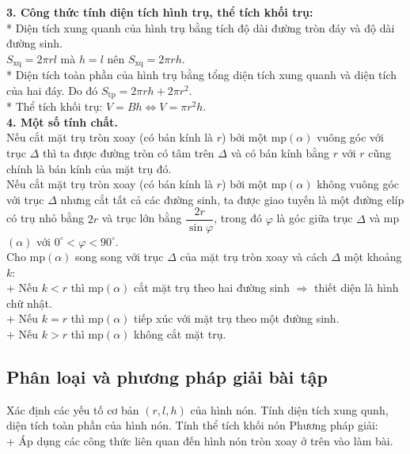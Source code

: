 \textbf{3. Công thức tính diện tích hình trụ, thể tích khối trụ:}\\
* Diện tích xung quanh của hình trụ bằng tích độ dài đường tròn đáy và độ dài đường sinh.\\
 $S_{\text{xq}}=2\pi rl$ mà $h=l$ nên $S_{\text{xq}}=2\pi rh$.\\
* Diện tích toàn phần của hình trụ bằng tổng diện tích xung quanh và diện tích của hai đáy. Do đó $S_{\text{tp}}=2\pi rh+2\pi r^2$.\\
* Thể tích khối trụ: $V=Bh\Leftrightarrow V=\pi r^2h$.\\
\textbf{4. Một số tính chất.}\\
Nếu cắt mặt trụ tròn xoay (có bán kính là $r$) bởi một mp$(\alpha)$ vuông góc với trục $\Delta$ thì ta được đường tròn có tâm trên $\Delta$ và có bán kính bằng $r$ với $r$ cũng chính là bán kính của mặt trụ đó.\\
Nếu cắt mặt trụ tròn xoay (có bán kính là $r$) bởi một mp$(\alpha)$ không vuông góc với trục $\Delta$ nhưng cắt tất cả các đường sinh, ta được giao tuyến là một đường elíp có trụ nhỏ bằng $2r$ và trục lớn bằng $\dfrac{2r}{\sin\varphi}$, trong đó $\varphi$ là góc giữa trục $\Delta$ và mp$(\alpha)$ với $0^{\circ}<\varphi<90^{\circ}$.\\
Cho mp$(\alpha)$ song song với trục $\Delta$ của mặt trụ tròn xoay và cách $\Delta$ một khoảng $k$:\\
+ Nếu $k<r$ thì mp$(\alpha)$ cắt mặt trụ theo hai đường sinh $\Rightarrow$ thiết diện là hình chữ nhật.\\
+ Nếu $k=r$ thì mp$(\alpha)$ tiếp xúc với mặt trụ theo một đường sinh.\\
+ Nếu $k>r$ thì mp$(\alpha)$ không cắt mặt trụ.
\subsection{Phân loại và phương pháp giải bài tập}
\begin{dang}{Xác định các yếu tố cơ bản $(r,l,h)$ của hình nón. Tính diện tích xung qunh, diện tích toàn phần của hình nón. Tính thể tích khối nón}
	Phương pháp giải:\\
	+ Áp dụng các công thức liên quan đến hình nón tròn xoay ở trên vào làm bài.	
\end{dang}
